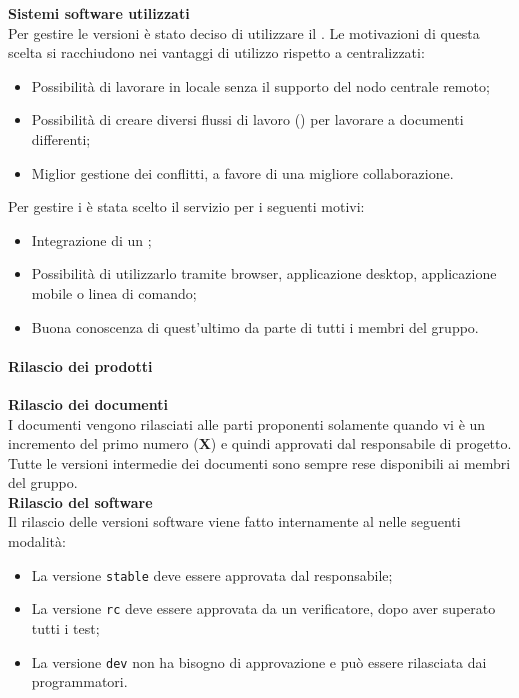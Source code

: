 \textbf{Sistemi software utilizzati}\\
Per gestire le versioni è stato deciso di utilizzare il  . 
Le motivazioni di questa scelta si racchiudono nei vantaggi di utilizzo rispetto a  centralizzati:
\begin{itemize}
	\item Possibilità di lavorare in locale senza il supporto del nodo centrale remoto; 
	\item Possibilità di creare diversi flussi di lavoro () per lavorare a documenti differenti;
	\item Miglior gestione dei conflitti, a favore di una migliore collaborazione.
\end{itemize}
Per gestire i   è stata scelto il servizio  per i seguenti motivi: 
\begin{itemize}
	\item Integrazione di un ;
	\item Possibilità di utilizzarlo tramite browser, applicazione desktop, applicazione mobile o linea di comando;
	\item Buona conoscenza di quest'ultimo da parte di tutti i membri del gruppo.
\end{itemize}

\paragraph{Rilascio dei prodotti}
\textbf{Rilascio dei documenti}\\
I documenti vengono rilasciati alle parti proponenti solamente quando vi è un incremento del primo numero (\textbf{X}) e quindi approvati dal responsabile di progetto. Tutte le versioni intermedie dei documenti sono sempre rese disponibili ai membri del gruppo.\\

\textbf{Rilascio del software}\\
Il rilascio delle versioni software viene fatto internamente al  nelle seguenti modalità:
\begin{itemize}
	\item La versione \texttt{stable} deve essere approvata dal responsabile;
	\item La versione \texttt{rc} deve essere approvata da un verificatore, dopo aver superato tutti i test;
	\item La versione \texttt{dev} non ha bisogno di approvazione e può essere rilasciata dai programmatori.
\end{itemize}

